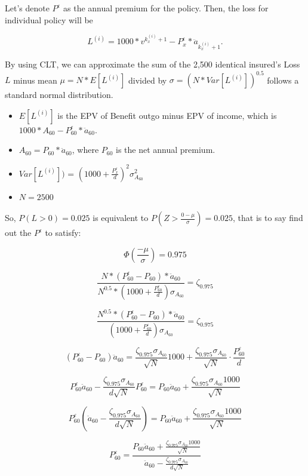 \documentclass[
]{article}
\begin{document}
Let's denote \(P^{\epsilon}\) as the annual premium for the policy.
Then, the loss for individual policy will be

\[
L^{(i)} = 1000*v^{k^{(i)}_x+1}-P^{\epsilon}_x*\ddot{a}_{k^{(i)}_x+1}.
\]

By using CLT, we can approximate the sum of the 2,500 identical
insured's Loss \(L\) minus mean \(\mu = N*E[L^{(i)}]\) divided by
\(\sigma = (N* Var[L^{(i)}])^{0.5}\) follows a standard normal
distribution.

\begin{itemize}
\item
  \(E[L^{(i)}]\) is the EPV of Benefit outgo minus EPV of income, which
  is \(1000*A_{60} - P^{\epsilon}_{60}*\ddot{a}_{60}\).
\item
  \(A_{60} = P_{60}*\ddot{a}_{60}\), where \(P_{60}\) is the net annual
  premium.
\item
  \(Var[L^{(i)}])\) =
  \(\left(1000+\frac{P_x^{\varepsilon}}{d}\right)^2 \sigma^2_{A_{60}}\)
\item
  \(N = 2500\)
\end{itemize}

So, \(P(L > 0 ) = 0.025\) is equivalent to
\(P(Z > \frac{0-\mu}{\sigma}) = 0.025\), that is to say find out the
\(P^{\epsilon}\) to satisfy:

\[
\Phi(\frac{-\mu}{\sigma}) = 0.975
\]

\[
\frac{N*(P^{\epsilon}_{60}-P_{60})*\ddot{a}_{60}}{N^{0.5}* \left(1000+\frac{P_{60}^{\varepsilon}}{d}\right) \sigma_{A_{60}}} = \zeta_{0.975}
\]

\[
\frac{N^{0.5}*(P^{\epsilon}_{60}-P_{60})*\ddot{a}_{60}}{ \left(1000+\frac{P_{60}^{\varepsilon}}{d}\right) \sigma_{A_{60}}} = \zeta_{0.975}
\]

\[
(P^{\varepsilon}_{60} - P_{60})\ddot{a}_{60} = \frac{\zeta_{0.975} \sigma_{A_{60}}}{\sqrt{N}} 1000 + \frac{\zeta_{0.975} \sigma_{A_{60}}}{\sqrt{N}} \cdot \frac{P^{\varepsilon}_{60}}{d}
\]

\[
P^{\varepsilon}_{60}\ddot{a}_{60} - \frac{\zeta_{0.975} \sigma_{A_{60}}}{d\sqrt{N}} P^{\varepsilon}_{60} = P_{60}\ddot{a}_{60} + \frac{\zeta_{0.975} \sigma_{A_{60}} 1000}{\sqrt{N}}
\]

\[
P^{\varepsilon}_{60} \left(\ddot{a}_{60} - \frac{\zeta_{0.975} \sigma_{A_{60}}}{d\sqrt{N}}\right) = P_{60}\ddot{a}_{60} + \frac{\zeta_{0.975} \sigma_{A_{60}} 1000}{\sqrt{N}}
\]

\[
P^{\varepsilon}_{60} = \frac{P_{60}\ddot{a}_{60} + \frac{\zeta_{0.975} \sigma_{A_{60}} 1000}{\sqrt{N}}}{\ddot{a}_{60} - \frac{\zeta_{0.975} \sigma_{A_{60}}}{d\sqrt{N}}}
\]
\end{document}
